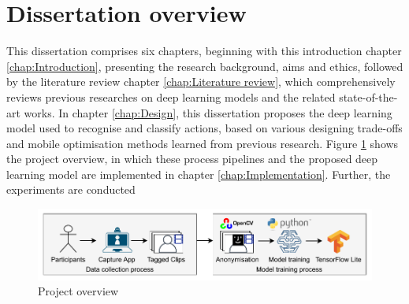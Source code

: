 \section{Dissertation overview}
\label{sec:Dissertation overview}
This dissertation comprises six chapters, beginning with this introduction chapter \ref{chap:Introduction}, presenting the research background, aims and ethics, followed by the literature review chapter \ref{chap:Literature review}, which comprehensively reviews previous researches on deep learning models and the related state-of-the-art works.
In chapter \ref{chap:Design}, this dissertation proposes the deep learning model used to recognise and classify actions, based on various designing trade-offs and mobile optimisation methods learned from previous research.
Figure \ref{fig:0-Intro-Overview} shows the project overview, in which these process pipelines and the proposed deep learning model are implemented in chapter \ref{chap:Implementation}.
Further, the experiments are conducted

\begin{figure}[h]
    \centering
    \hspace*{-.5cm}
    \includegraphics[scale=1.1]{introduction/imgs/0-Intro-Overview.pdf}
    \caption{Project overview}
    \label{fig:0-Intro-Overview}
\end{figure}